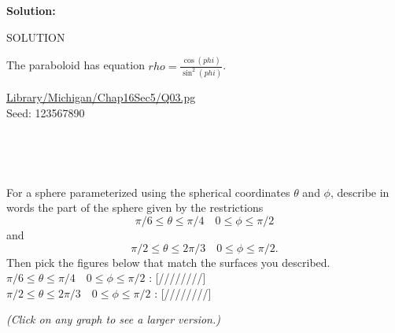 \documentclass[10pt,]{book}
\theoremstyle{plain}
\theoremstyle{definition}
\theoremstyle{definition}
\theoremstyle{definition}
\theoremstyle{definition}
\theoremstyle{definition}
\numberwithin{equation}{section}
\begin{document}
\begin{exercisegroup}
\begin{mdframed}
{\par \par {\bf Solution: }\par  SOLUTION \par 

The paraboloid has equation \(rho = \frac{\cos\!\left(phi\right)}{\sin^{2}\!\left(phi\right)}\).


\par 
}\par\vspace*{2ex}%
{\tiny\ttfamily\noindent\url{Library/Michigan/Chap16Sec5/Q03.pg}\\Seed: 123567890\hfill}\end{mdframed}
\exercise[3.]\hypertarget{exercise-34}{}\mbox{}\\ %
\exercise[4.]\hypertarget{exercise-35}{}\mbox{}\\ %
\begin{mdframed}
{
For a sphere parameterized using the spherical coordinates
\(\theta\) and \(\phi\), describe in words the part of the sphere
given by the restrictions
\[\pi/6 \leq\theta\le \pi/4 \quad 0\le\phi\leq \pi/2\]
and
\[\pi/2 \leq\theta\le 2\pi/3 \quad 0\le\phi\leq \pi/2.\]
Then pick the figures below that match the surfaces you described.
\leavevmode\\\relax 
\(\pi/6 \leq\theta\le \pi/4 \quad 0\le\phi\leq \pi/2\) :
[////////]
\leavevmode\\\relax 
\(\pi/2 \leq\theta\le 2\pi/3 \quad 0\le\phi\leq \pi/2\) :
[////////]
\par 
\begin{center} 
{\it (Click on any graph to see a larger version.)} 
\leavevmode\\\relax 


\end{center}}
\end{mdframed}
\end{exercisegroup}
\end{document}
